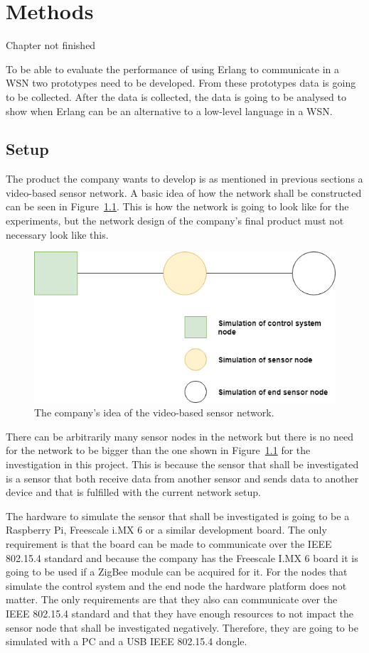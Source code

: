 \chapter{Methods}
Chapter not finished

To be able to evaluate the performance of using Erlang to communicate in a WSN two prototypes need to be developed. From these prototypes data is going to be collected. After the data is collected, the data is going to be analysed to show when Erlang can be an alternative to a low-level language in a WSN. 

\section{Setup}
The product the company wants to develop is as mentioned in previous sections a video-based sensor network. A basic idea of how the network shall be constructed can be seen in Figure~\ref{fig:setup}. This is how the network is going to look like for the experiments, but the network design of the company’s final product must not necessary look like this. 

\begin{figure}[H]
\centering
\includegraphics[scale=0.6]{figure/setup.png}
\caption{The company’s idea of the video-based sensor network.}
\label{fig:setup}
\end{figure}

There can be arbitrarily many sensor nodes in the network but there is no need for the network to be bigger than the one shown in Figure~\ref{fig:setup} for the investigation in this project. This is because the sensor that shall be investigated is a sensor that both receive data from another sensor and sends data to another device and that is fulfilled with the current network setup. 

The hardware to simulate the sensor that shall be investigated is going to be a Raspberry Pi, Freescale i.MX 6 or a similar development board. The only requirement is that the board can be made to communicate over the IEEE 802.15.4 standard and because the company has the Freescale I.MX 6 board it is going to be used if a ZigBee module can be acquired for it. For the nodes that simulate the control system and the end node the hardware platform does not matter. The only requirements are that they also can communicate over the IEEE 802.15.4 standard and that they have enough resources to not impact the sensor node that shall be investigated negatively. Therefore, they are going to be simulated with a PC and a USB IEEE 802.15.4 dongle.

